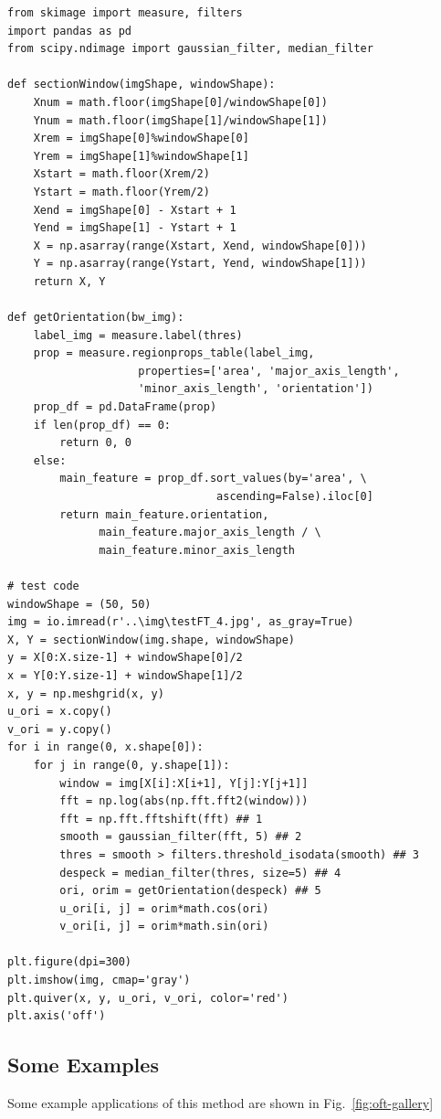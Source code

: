 \begin{verbatim}
from skimage import measure, filters
import pandas as pd
from scipy.ndimage import gaussian_filter, median_filter

def sectionWindow(imgShape, windowShape):
    Xnum = math.floor(imgShape[0]/windowShape[0])
    Ynum = math.floor(imgShape[1]/windowShape[1])
    Xrem = imgShape[0]%windowShape[0]
    Yrem = imgShape[1]%windowShape[1]
    Xstart = math.floor(Xrem/2)
    Ystart = math.floor(Yrem/2)
    Xend = imgShape[0] - Xstart + 1
    Yend = imgShape[1] - Ystart + 1
    X = np.asarray(range(Xstart, Xend, windowShape[0]))
    Y = np.asarray(range(Ystart, Yend, windowShape[1]))
    return X, Y

def getOrientation(bw_img):
    label_img = measure.label(thres)
    prop = measure.regionprops_table(label_img,
                    properties=['area', 'major_axis_length',
                    'minor_axis_length', 'orientation'])
    prop_df = pd.DataFrame(prop)
    if len(prop_df) == 0:
        return 0, 0
    else:
        main_feature = prop_df.sort_values(by='area', \
                                ascending=False).iloc[0]
        return main_feature.orientation,
              main_feature.major_axis_length / \
              main_feature.minor_axis_length

# test code
windowShape = (50, 50)
img = io.imread(r'..\img\testFT_4.jpg', as_gray=True)
X, Y = sectionWindow(img.shape, windowShape)
y = X[0:X.size-1] + windowShape[0]/2
x = Y[0:Y.size-1] + windowShape[1]/2
x, y = np.meshgrid(x, y)
u_ori = x.copy()
v_ori = y.copy()
for i in range(0, x.shape[0]):
    for j in range(0, y.shape[1]):
        window = img[X[i]:X[i+1], Y[j]:Y[j+1]]
        fft = np.log(abs(np.fft.fft2(window)))
        fft = np.fft.fftshift(fft) ## 1
        smooth = gaussian_filter(fft, 5) ## 2
        thres = smooth > filters.threshold_isodata(smooth) ## 3
        despeck = median_filter(thres, size=5) ## 4
        ori, orim = getOrientation(despeck) ## 5
        u_ori[i, j] = orim*math.cos(ori)
        v_ori[i, j] = orim*math.sin(ori)

plt.figure(dpi=300)
plt.imshow(img, cmap='gray')
plt.quiver(x, y, u_ori, v_ori, color='red')
plt.axis('off')
\end{verbatim}

\subsection{Some Examples}
\label{sec:oft-gallery}
Some example applications of this method are shown in Fig.~\ref{fig:oft-gallery}

